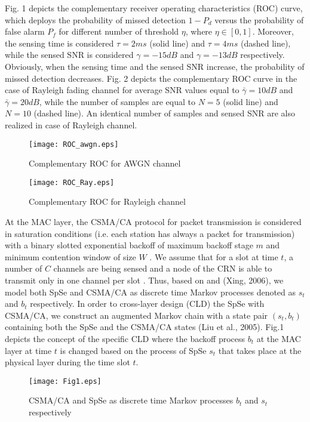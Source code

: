 \documentclass
[journal,11pt,draftclsnofoot,onecolumn,doublespace]{tETN2e}
\begin{document}
Fig. 1 depicts the complementary receiver operating characteristics (ROC) curve, which deploys the probability of missed detection $1-P_d$ versus the probability of false alarm $P_f$ for different number of threshold $\eta$, where $\eta \in [0,1]$. Moreover, the sensing time is considered $\tau=2ms$ (solid line) and $\tau=4ms$ (dashed line), while the sensed SNR is considered $\gamma=-15dB$  and  $\gamma=-13dB$ respectively. Obviously, when the sensing time and the sensed SNR increase, the probability of missed detection decreases. Fig. 2 depicts the complementary ROC curve in the case of Rayleigh fading channel for average SNR values equal to $\bar{\gamma}=10dB$ and $\bar{\gamma}=20dB$, while the number of samples are equal to $N=5$ (solid line) and $N=10$ (dashed line). An identical number of samples and sensed SNR are also realized in case of Rayleigh channel.  

\begin{figure}
\centering
  \texttt{[image: ROC\_awgn.eps]}\\
  \caption{Complementary ROC for AWGN channel}
  \label{fig:ROC_awgn}
\end{figure}

\begin{figure}
\centering
  \texttt{[image: ROC\_Ray.eps]}\\
  \caption{Complementary ROC for Rayleigh channel}
  \label{fig:ROC_Ray}
\end{figure}

At the MAC layer, the CSMA/CA protocol for packet transmission is considered in saturation conditions (i.e. each station has always a packet for transmission) with a binary slotted exponential backoff of maximum backoff stage $m$ and minimum contention window of size $W$ \citep{bianchi00}. We assume that for a slot at time $t$, a number of $C$ channels are being sensed and a node of the CRN is able to transmit only in one channel per slot \citep{bianchi00}. Thus, based on \citep{bianchi00} and (Xing, 2006), we model both SpSe and CSMA/CA as discrete time Markov processes denoted as $s_t$ and $b_t$ respectively. In order to cross-layer design (CLD) the SpSe with CSMA/CA, we construct an augmented Markov chain with a state pair $(s_t,b_t)$ containing both the SpSe and the CSMA/CA states (Liu et al., 2005). Fig.1 depicts the concept of the specific CLD where the backoff process $b_t$ at the MAC layer at time $t$ is changed based on the process of SpSe $s_t$ that takes place at the physical layer during the time slot $t$.
\begin{figure}
\centering
  \texttt{[image: Fig1.eps]}\\
  \caption{CSMA/CA and SpSe as discrete time Markov processes $b_t$ and $s_t$ respectively}
  \label{fig:systemmodel}
\end{figure}
\end{document}

